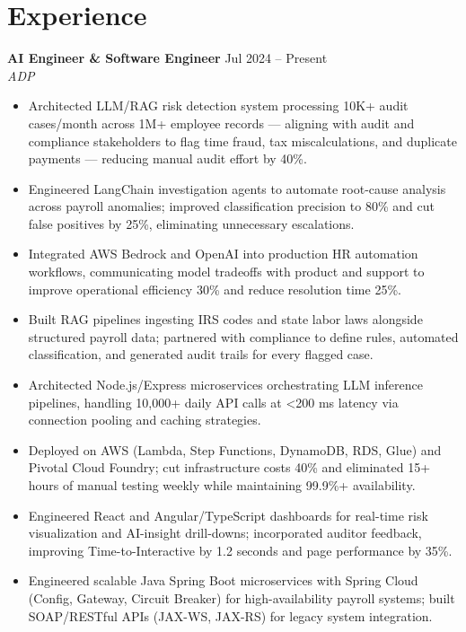 \documentclass[10pt,letterpaper]{article}
\newcommand{\entry}[3]{%
  \vspace{3pt}\textbf{#1} \hfill #3 \\
  \textit{\small #2}\vspace{1pt}}
\begin{document}
\section{Experience}

\entry{AI Engineer \& Software Engineer}{ADP}{Jul 2024 -- Present}
\begin{itemize}
  \item Architected LLM/RAG risk detection system processing 10K+ audit cases/month across 1M+ employee records --- aligning with audit and compliance stakeholders to flag time fraud, tax miscalculations, and duplicate payments --- reducing manual audit effort by 40\%.
  \item Engineered LangChain investigation agents to automate root-cause analysis across payroll anomalies; improved classification precision to 80\% and cut false positives by 25\%, eliminating unnecessary escalations.
  \item Integrated AWS Bedrock and OpenAI into production HR automation workflows, communicating model tradeoffs with product and support to improve operational efficiency 30\% and reduce resolution time 25\%.
  \item Built RAG pipelines ingesting IRS codes and state labor laws alongside structured payroll data; partnered with compliance to define rules, automated classification, and generated audit trails for every flagged case.
  \item Architected Node.js/Express microservices orchestrating LLM inference pipelines, handling 10,000+ daily API calls at \textless{}200 ms latency via connection pooling and caching strategies.
  \item Deployed on AWS (Lambda, Step Functions, DynamoDB, RDS, Glue) and Pivotal Cloud Foundry; cut infrastructure costs 40\% and eliminated 15+ hours of manual testing weekly while maintaining 99.9\%+ availability.
  \item Engineered React and Angular/TypeScript dashboards for real-time risk visualization and AI-insight drill-downs; incorporated auditor feedback, improving Time-to-Interactive by 1.2 seconds and page performance by 35\%.
  \item Engineered scalable Java Spring Boot microservices with Spring Cloud (Config, Gateway, Circuit Breaker) for high-availability payroll systems; built SOAP/RESTful APIs (JAX-WS, JAX-RS) for legacy system integration.
\end{itemize}
\end{document}
